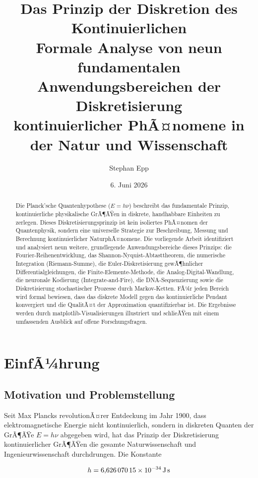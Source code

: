 ﻿\documentclass[a4paper,12pt]{article}
\title{\textbf{Das Prinzip der Diskretion des Kontinuierlichen}\\[0.5em]
\large Formale Analyse von neun fundamentalen Anwendungsbereichen der Diskretisierung\\
kontinuierlicher PhÃ¤nomene in der Natur und Wissenschaft}
\author{Stephan Epp}
\date{6. Juni 2026}
\theoremstyle{definition}
\begin{document}
\maketitle

\begin{abstract}
\noindent
Die Planck'sche Quantenhypothese ($E = h\nu$) beschreibt das fundamentale Prinzip, kontinuierliche physikalische GrÃ¶ÃŸen in diskrete, handhabbare Einheiten zu zerlegen. Dieses Diskretisierungsprinzip ist kein isoliertes PhÃ¤nomen der Quantenphysik, sondern eine universelle Strategie zur Beschreibung, Messung und Berechnung kontinuierlicher Natur\-phÃ¤nomene. Die vorliegende Arbeit identifiziert und analysiert neun weitere, grundlegende Anwendungsbereiche dieses Prinzips: die Fourier-Reihenentwicklung, das Shannon-Nyquist-Abtasttheorem, die numerische Integration (Riemann-Summe), die Euler-Diskretisierung gewÃ¶hnlicher Differentialgleichungen, die Finite-Elemente-Methode, die Analog-Digital-Wandlung, die neuronale Kodierung (Integrate-and-Fire), die DNA-Sequenzierung sowie die Diskretisierung stochastischer Prozesse durch Markov-Ketten. FÃ¼r jeden Bereich wird formal bewiesen, dass das diskrete Modell gegen das kontinuierliche Pendant konvergiert und die QualitÃ¤t der Approximation quantifizierbar ist. Die Ergebnisse werden durch matplotlib-Visualisierungen illustriert und schlieÃŸen mit einem umfassenden Ausblick auf offene Forschungsfragen.
\end{abstract}

\tableofcontents
\newpage

\section{EinfÃ¼hrung}

\subsection{Motivation und Problemstellung}

Seit Max Plancks revolutionÃ¤rer Entdeckung im Jahr 1900, dass elektromagnetische Energie nicht kontinuierlich, sondern in diskreten Quanten der GrÃ¶ÃŸe $E = h\nu$ abgegeben wird, hat das Prinzip der Diskretisierung kontinuierlicher GrÃ¶ÃŸen die gesamte Naturwissenschaft und Ingenieurwissenschaft durchdrungen. Die Konstante

\[
h = 6{,}626\,070\,15 \times 10^{-34}\,\text{J\,s}
\]
\end{document}
